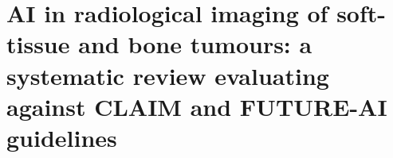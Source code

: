 
%	
%	
\chapter[AI in radiological imaging of soft-tissue and bone tumours: a systematic review evaluating against CLAIM and FUTURE-AI guidelines][Systematic review on AI for STBT]{AI in radiological imaging of soft-tissue and bone tumours: a systematic review evaluating against CLAIM and FUTURE-AI guidelines}\label{chap: chapter01}

